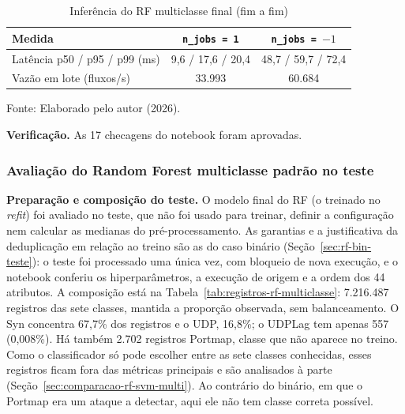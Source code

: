 \documentclass[
    12pt,                %
    openright,           %
    oneside,             %
    a4paper,             %
    english,             %
    brazil               %
]{abntex2}
\begin{document}
\begin{table}
\centering
\caption{Inferência do RF multiclasse final (fim a fim)}
\label{tab:rf-multi-inferencia}
\begin{tabular}{lcc}
\hline
Medida & \texttt{n\_jobs = 1} & \texttt{n\_jobs = $-1$} \\
\hline
Latência p50 / p95 / p99 (ms) & 9,6 / 17,6 / 20,4 & 48,7 / 59,7 / 72,4 \\
Vazão em lote (fluxos/s) & 33.993 & 60.684 \\
\hline
\end{tabular}
\par\smallskip
Fonte: Elaborado pelo autor (2026).
\end{table}
 
\textbf{Verificação.} As 17 checagens do notebook foram aprovadas.
 
 
\subsubsection{Avaliação do Random Forest multiclasse padrão no teste}
\label{sec:rf-multi-teste}
 
\textbf{Preparação e composição do teste.} O modelo final do RF (o treinado no \textit{refit}) foi avaliado no teste, que não foi usado para treinar, definir a configuração nem calcular as medianas do pré-processamento. As garantias e a justificativa da deduplicação em relação ao treino são as do caso binário (Seção~\ref{sec:rf-bin-teste}): o teste foi processado uma única vez, com bloqueio de nova execução, e o notebook conferiu os hiperparâmetros, a execução de origem e a ordem dos 44 atributos. A composição está na Tabela~\ref{tab:registros-rf-multiclasse}: 7.216.487 registros das sete classes, mantida a proporção observada, sem balanceamento. O Syn concentra 67,7\% dos registros e o UDP, 16,8\%; o UDPLag tem apenas 557 (0,008\%). Há também 2.702 registros Portmap, classe que não aparece no treino. Como o classificador só pode escolher entre as sete classes conhecidas, esses registros ficam fora das métricas principais e são analisados à parte (Seção~\ref{sec:comparacao-rf-svm-multi}). Ao contrário do binário, em que o Portmap era um ataque a detectar, aqui ele não tem classe correta possível.
 
\end{document}
